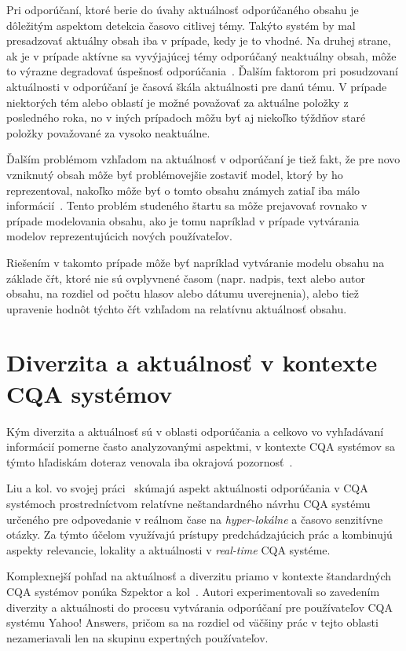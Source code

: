 Pri odporúčaní, ktoré berie do úvahy aktuálnosť odporúčaného obsahu je dôležitým aspektom detekcia časovo citlivej témy.
Takýto systém by mal presadzovať aktuálny obsah iba v prípade, kedy je to vhodné. Na druhej strane, ak je v prípade
aktívne sa vyvýjajúcej témy odporúčaný neaktuálny obsah, môže to výrazne degradovať úspešnosť odporúčania~\cite{Dong2010}.
Ďalším faktorom pri posudzovaní aktuálnosti v odporúčaní je časová škála aktuálnosti pre danú tému.
V prípade niektorých tém alebo oblastí je možné považovať za aktuálne položky z posledného roka, no v iných prípadoch
môžu byť aj niekoľko týždňov staré položky považované za vysoko neaktuálne.

Ďalším problémom vzhľadom na aktuálnosť v odporúčaní je tiež fakt, že pre novo vzniknutý obsah môže byť problémovejšie
zostaviť model, ktorý by ho reprezentoval, nakoľko môže byť o tomto obsahu známych zatiaľ iba málo informácií~\cite{Dong2010TW}.
Tento problém studeného štartu sa môže prejavovať rovnako v prípade modelovania obsahu, ako je tomu napríklad v prípade
vytvárania modelov reprezentujúcich nových používateľov.

Riešením v takomto prípade môže byť napríklad vytváranie modelu
obsahu na základe čŕt, ktoré nie sú ovplyvnené časom (napr. nadpis, text alebo autor obsahu, na rozdiel od počtu hlasov
alebo dátumu uverejnenia), alebo tiež upravenie hodnôt týchto čŕt vzhľadom na relatívnu aktuálnosť obsahu.


\section{Diverzita a aktuálnosť v kontexte CQA systémov}

Kým diverzita a aktuálnosť sú v oblasti odporúčania a celkovo vo vyhľadávaní informácií pomerne často analyzovanými aspektmi,
v kontexte CQA systémov sa týmto hľadiskám doteraz venovala iba okrajová pozornosť~\cite{Srba2016}.

Liu a kol. vo svojej práci~\cite{Liu2015} skúmajú aspekt aktuálnosti odporúčania v CQA systémoch prostredníctvom
relatívne neštandardného návrhu CQA systému určeného pre odpovedanie v reálnom čase na \emph{hyper-lokálne} a časovo senzitívne
otázky. Za týmto účelom využívajú prístupy predchádzajúcich prác a kombinujú aspekty relevancie, lokality a aktuálnosti
v \emph{real-time} CQA systéme.


Komplexnejší pohľad na aktuálnosť a diverzitu priamo v kontexte štandardných CQA systémov ponúka Szpektor a kol~\cite{Szpektor2013}.
Autori experimentovali so zavedením diverzity a aktuálnosti do procesu vytvárania odporúčaní pre používateľov CQA
systému Yahoo! Answers, pričom sa na rozdiel od väčšiny prác v tejto oblasti nezameriavali len na skupinu expertných používateľov.

